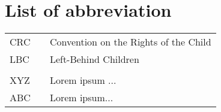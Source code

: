 \section*{List of abbreviation}


\begin{table}[ht]
    \centering
    \begin{tabular}{lll}
        CRC     &&      Convention on the Rights of the Child \\
        LBC     &&      Left-Behind Children \\
                &&              \\
        XYZ     &&      Lorem ipsum ... \\
        ABC     &&      Lorem ipsum...                     
    \end{tabular}
\end{table}